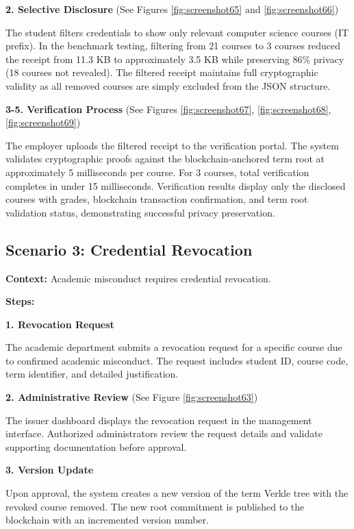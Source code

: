 \textbf{2. Selective Disclosure} (See Figures \ref{fig:screenshot65} and \ref{fig:screenshot66})

The student filters credentials to show only relevant computer science courses (IT prefix). In the benchmark testing, filtering from 21 courses to 3 courses reduced the receipt from 11.3 KB to approximately 3.5 KB while preserving 86\% privacy (18 courses not revealed). The filtered receipt maintains full cryptographic validity as all removed courses are simply excluded from the JSON structure.

\textbf{3-5. Verification Process} (See Figures \ref{fig:screenshot67}, \ref{fig:screenshot68}, \ref{fig:screenshot69})

The employer uploads the filtered receipt to the verification portal. The system validates cryptographic proofs against the blockchain-anchored term root at approximately 5 milliseconds per course. For 3 courses, total verification completes in under 15 milliseconds. Verification results display only the disclosed courses with grades, blockchain transaction confirmation, and term root validation status, demonstrating successful privacy preservation.

\subsection{Scenario 3: Credential Revocation}
\label{subsec:scenario-revocation}

\textbf{Context:} Academic misconduct requires credential revocation.

\textbf{Steps:}

\textbf{1. Revocation Request}

The academic department submits a revocation request for a specific course due to confirmed academic misconduct. The request includes student ID, course code, term identifier, and detailed justification.

\textbf{2. Administrative Review} (See Figure \ref{fig:screenshot63})

The issuer dashboard displays the revocation request in the management interface. Authorized administrators review the request details and validate supporting documentation before approval.

\textbf{3. Version Update}

Upon approval, the system creates a new version of the term Verkle tree with the revoked course removed. The new root commitment is published to the blockchain with an incremented version number.

